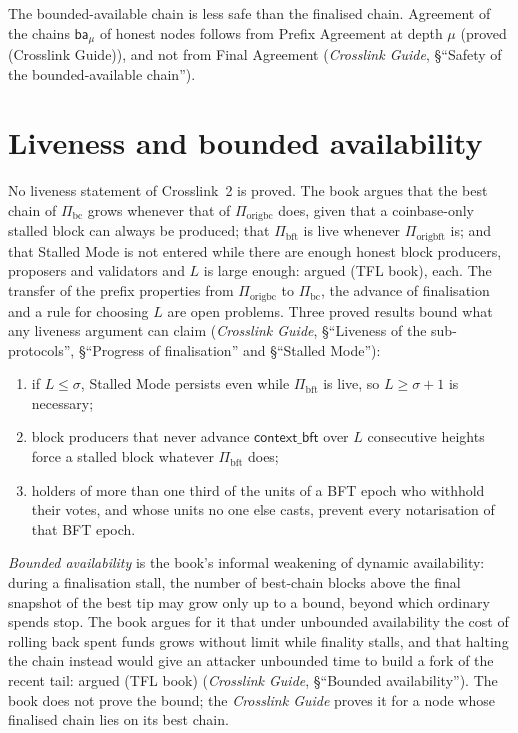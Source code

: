 \documentclass[11pt,a4paper]{article}
\theoremstyle{definition}
\newcommand{\bc}{\mathrm{bc}}
\newcommand{\bft}{\mathrm{bft}}
\newcommand{\Piorigbc}{\Pi_{\mathrm{origbc}}}
\newcommand{\Piorigbft}{\Pi_{\mathrm{origbft}}}
\newcommand{\Pibc}{\Pi_{\bc}}
\newcommand{\Pibft}{\Pi_{\bft}}
\newcommand{\contextbft}{\mathsf{context\_bft}}
\newcommand{\ba}{\mathsf{ba}}
\begin{document}
The bounded-available chain is less safe than the finalised chain.
Agreement of the chains $\ba_\mu$ of honest nodes follows from Prefix
Agreement at depth $\mu$ (proved (Crosslink Guide)), and not from Final
Agreement (\emph{Crosslink Guide}, \S``Safety of the bounded-available
chain'').

\section{Liveness and bounded availability}\label{sec:live}

No liveness statement of Crosslink~2 is proved. The book argues that the
best chain of $\Pibc$ grows whenever that of $\Piorigbc$ does, given that a
coinbase-only stalled block can always be produced; that $\Pibft$ is live
whenever $\Piorigbft$ is; and that Stalled Mode is not entered while there
are enough honest block producers, proposers and validators and $L$ is large
enough: argued (TFL book), each. The transfer of the prefix properties from
$\Piorigbc$ to $\Pibc$, the advance of finalisation and a rule for choosing
$L$ are open problems. Three proved results bound what any liveness argument
can claim (\emph{Crosslink Guide}, \S``Liveness of the sub-protocols'',
\S``Progress of finalisation'' and \S``Stalled Mode''):
\begin{enumerate}[label=(\roman*)]
\item if $L \le \sigma$, Stalled Mode persists even while $\Pibft$ is live,
  so $L \ge \sigma + 1$ is necessary;
\item block producers that never advance $\contextbft$ over $L$ consecutive
  heights force a stalled block whatever $\Pibft$ does;
\item holders of more than one third of the units of a BFT epoch who
  withhold their votes, and whose units no one else casts, prevent every
  notarisation of that BFT epoch.
\end{enumerate}

\emph{Bounded availability} is the book's informal weakening of dynamic
availability: during a finalisation stall, the number of best-chain blocks
above the final snapshot of the best tip may grow only up to a bound,
beyond which ordinary spends stop. The book argues for it that under unbounded
availability the cost of rolling back spent funds grows without limit while
finality stalls, and that halting the chain instead would give an attacker
unbounded time to build a fork of the recent tail: argued (TFL book)
(\emph{Crosslink Guide}, \S``Bounded availability''). The book does not
prove the bound; the \emph{Crosslink Guide} proves it for a node whose
finalised chain lies on its best chain.
\end{document}
